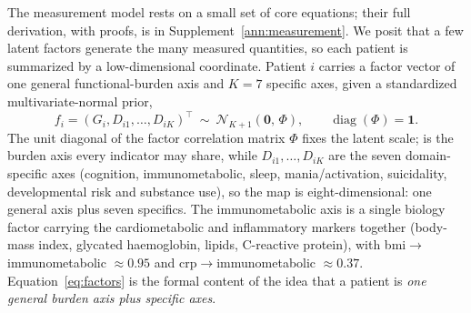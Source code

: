 The measurement model rests on a small set of core equations; their full derivation, with
proofs, is in Supplement~\ref{ann:measurement}. We posit that a few latent factors generate the many
measured quantities, so each patient is summarized by a low-dimensional coordinate.
Patient $i$ carries a factor vector of one general functional-burden axis \Gfac{} and
$K=7$ specific axes, given a standardized multivariate-normal prior,
\begin{equation}
  f_i=(G_i,D_{i1},\dots,D_{iK})^{\top}\ \sim\ \mathcal{N}_{K+1}\!\left(\mathbf 0,\,\Phi\right),
  \qquad \operatorname{diag}(\Phi)=\mathbf 1 .
  \label{eq:factors}
\end{equation}
The unit diagonal of the factor correlation matrix $\Phi$ fixes the latent scale;
\Gfac{} is the burden axis every indicator may share, while $D_{i1},\dots,D_{iK}$ are the
seven domain-specific axes (cognition, immunometabolic, sleep, mania/activation,
suicidality, developmental risk and substance use), so the map is eight-dimensional:
one general axis plus seven specifics. The immunometabolic axis is a single biology
factor carrying the cardiometabolic and inflammatory markers together (body-mass index,
glycated haemoglobin, lipids, C-reactive protein), with bmi$\to$immunometabolic $\approx
0.95$ and crp$\to$immunometabolic $\approx 0.37$. Equation~\eqref{eq:factors} is the
formal content of the idea that a patient is \emph{one general burden axis plus specific
axes}.

